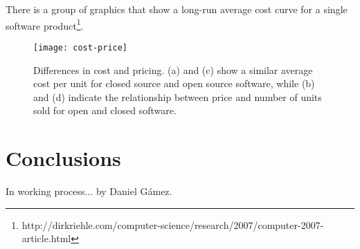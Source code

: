 There is a group of graphics that show a long-run average cost curve for a single software product\footnote{http://dirkriehle.com/computer-science/research/2007/computer-2007-article.html}.

\begin{figure}[h]
\begin{center}
\texttt{[image: cost-price]}
\caption{Differences in cost and pricing. (a) and (c) show a similar average cost per unit for closed source and open source software, while (b) and (d) indicate the relationship between price and number of units sold for open and closed software.}
\label{fig:cost-price}
\end{center}
\end{figure}

\section{Conclusions}\label{conclusions}

In working process... by Daniel G\'amez.\\
